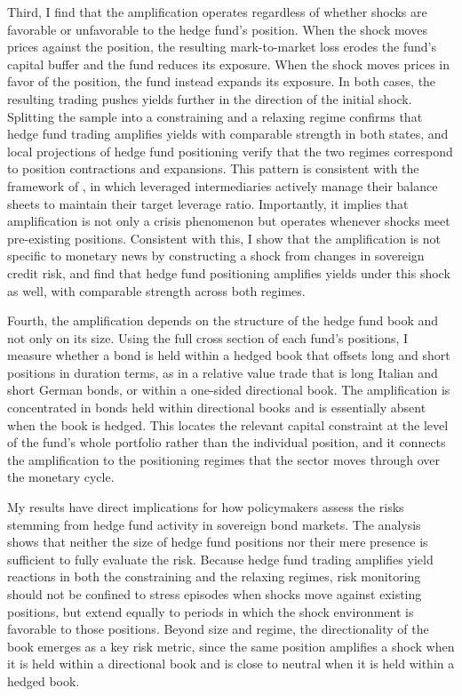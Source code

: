 \documentclass[english, 11pt, oneside]{article}
\begin{document}
Third, I find that the amplification operates regardless of whether shocks are favorable or unfavorable to the hedge fund's position. When the shock moves prices against the position, the resulting mark-to-market loss erodes the fund's capital buffer and the fund reduces its exposure. When the shock moves prices in favor of the position, the fund instead expands its exposure. In both cases, the resulting trading pushes yields further in the direction of the initial shock. Splitting the sample into a constraining and a relaxing regime confirms that hedge fund trading amplifies yields with comparable strength in both states, and local projections of hedge fund positioning verify that the two regimes correspond to position contractions and expansions. This pattern is consistent with the framework of \citet{adrian2014}, in which leveraged intermediaries actively manage their balance sheets to maintain their target leverage ratio. Importantly, it implies that amplification is not only a crisis phenomenon but operates whenever shocks meet pre-existing positions. Consistent with this, I show that the amplification is not specific to monetary news by constructing a shock from changes in sovereign credit risk, and find that hedge fund positioning amplifies yields under this shock as well, with comparable strength across both regimes.

Fourth, the amplification depends on the structure of the hedge fund book and not only on its size. Using the full cross section of each fund's positions, I measure whether a bond is held within a hedged book that offsets long and short positions in duration terms, as in a relative value trade that is long Italian and short German bonds, or within a one-sided directional book. The amplification is concentrated in bonds held within directional books and is essentially absent when the book is hedged. This locates the relevant capital constraint at the level of the fund's whole portfolio rather than the individual position, and it connects the amplification to the positioning regimes that the sector moves through over the monetary cycle.

My results have direct implications for how policymakers assess the risks stemming from hedge fund activity in sovereign bond markets. The analysis shows that neither the size of hedge fund positions nor their mere presence is sufficient to fully evaluate the risk. Because hedge fund trading amplifies yield reactions in both the constraining and the relaxing regimes, risk monitoring should not be confined to stress episodes when shocks move against existing positions, but extend equally to periods in which the shock environment is favorable to those positions. Beyond size and regime, the directionality of the book emerges as a key risk metric, since the same position amplifies a shock when it is held within a directional book and is close to neutral when it is held within a hedged book.
\end{document}
